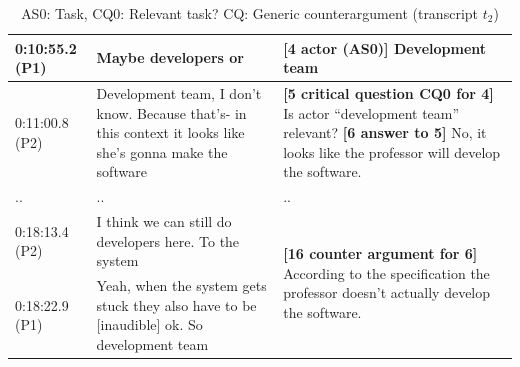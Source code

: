 \documentclass[11.5pt,two column]{llncs}
\begin{document}
\begin{table}[!htbp]
\begin{tabular}{|p{20mm}|p{60mm}|p{70mm}|}
0:10:55.2 (P1) & Maybe developers or & \textbf{[4 actor (AS0)]} Development team\\
\hline
0:11:00.8 (P2)&Development team, I don't know. Because that's- in this context it looks like she's gonna make the software&\textbf{[5 critical question CQ0 for 4]} Is actor ``development team'' relevant?\newline
\textbf{[6 answer to 5]} No, it looks like the professor will develop the software.\\
\hline
..&..&..\\
\hline
0:18:13.4 (P2) & I think we can still do developers here. To the system & \multirow{2}{70mm}{\textbf{[16 counter argument for 6]} According to the specification the professor doesn't actually develop the software.}\\
\cline{1-2}
0:18:22.9 (P1)&Yeah, when the system gets stuck they also have to be [inaudible] ok. So development team&\\	
\hline	
\end{tabular}
\caption{AS0: Task, CQ0: Relevant task? CQ: Generic counterargument (transcript $t_2$)}
\label{table:transcript:as0-cq0-cq_counterarg}

\end{table}
\end{document}
